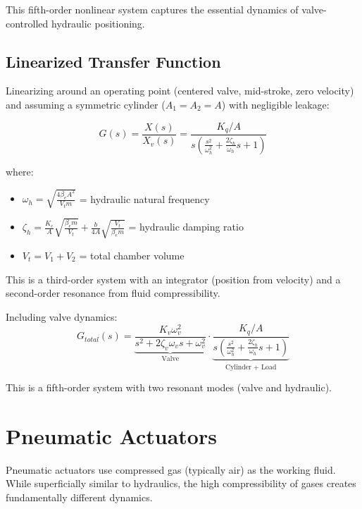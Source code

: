 This fifth-order nonlinear system captures the essential dynamics of valve-controlled hydraulic positioning.

\subsection{Linearized Transfer Function}

Linearizing around an operating point (centered valve, mid-stroke, zero velocity) and assuming a symmetric cylinder ($A_1 = A_2 = A$) with negligible leakage:

\begin{equation}
    \boxed{G(s) = \frac{X(s)}{X_v(s)} = \frac{K_q / A}{s \left(\frac{s^2}{\omega_h^2} + \frac{2\zeta_h}{\omega_h}s + 1\right)}}
    \label{eq:hydraulic_tf}
\end{equation}

where:
\begin{itemize}
    \item $\omega_h = \sqrt{\frac{4\beta_e A^2}{V_t m}}$ = hydraulic natural frequency
    \item $\zeta_h = \frac{K_c}{A}\sqrt{\frac{\beta_e m}{V_t}} + \frac{b}{4A}\sqrt{\frac{V_t}{\beta_e m}}$ = hydraulic damping ratio
    \item $V_t = V_1 + V_2$ = total chamber volume
\end{itemize}

This is a third-order system with an integrator (position from velocity) and a second-order resonance from fluid compressibility.

Including valve dynamics:
\begin{equation}
    G_{total}(s) = \underbrace{\frac{K_v \omega_v^2}{s^2 + 2\zeta_v \omega_v s + \omega_v^2}}_{\text{Valve}} \cdot \underbrace{\frac{K_q / A}{s \left(\frac{s^2}{\omega_h^2} + \frac{2\zeta_h}{\omega_h}s + 1\right)}}_{\text{Cylinder + Load}}
\end{equation}

This is a fifth-order system with two resonant modes (valve and hydraulic).

\section{Pneumatic Actuators}
\label{sec:pneumatic_actuators}

Pneumatic actuators use compressed gas (typically air) as the working fluid. While superficially similar to hydraulics, the high compressibility of gases creates fundamentally different dynamics.

